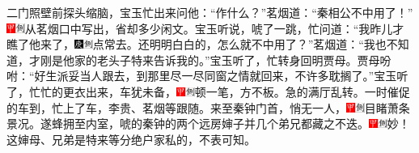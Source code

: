 {{{{{{{{{二门照壁前探头缩脑，宝玉忙出来问他：“作什么？”茗烟道：“秦相公不中用了！”{\includegraphics[width=3mm]{../Images/00002}\includegraphics[width=3mm]{../Images/00011}\footnotesize \kaishu 从茗烟口中写出，省却多少闲文。}宝玉听说，唬了一跳，忙问道：“我昨儿才瞧了他来了，{\includegraphics[width=3mm]{../Images/00004}\includegraphics[width=3mm]{../Images/00011}\footnotesize \kaishu 点常去。}还明明白白的，怎么就不中用了？”茗烟道：“我也不知道，才刚是他家的老头子特来告诉我的。”宝玉听了，忙转身回明贾母。贾母吩咐：“好生派妥当人跟去，到那里尽一尽同窗之情就回来，不许多耽搁了。”宝玉听了，忙忙的更衣出来，车犹未备，{\includegraphics[width=3mm]{../Images/00002}\includegraphics[width=3mm]{../Images/00011}\footnotesize \kaishu 顿一笔，方不板。}急的满厅乱转。一时催促的车到，忙上了车，李贵、茗烟等跟随。来至秦钟门首，悄无一人，{\includegraphics[width=3mm]{../Images/00002}\includegraphics[width=3mm]{../Images/00011}\footnotesize \kaishu 目睹萧条景况。}遂蜂拥至内室，唬的秦钟的两个远房婶子并几个弟兄都藏之不迭。{\includegraphics[width=3mm]{../Images/00002}\includegraphics[width=3mm]{../Images/00011}\footnotesize \kaishu 妙！这婶母、兄弟是特来等分绝户家私的，不表可知。}

}}}}}}}}}
